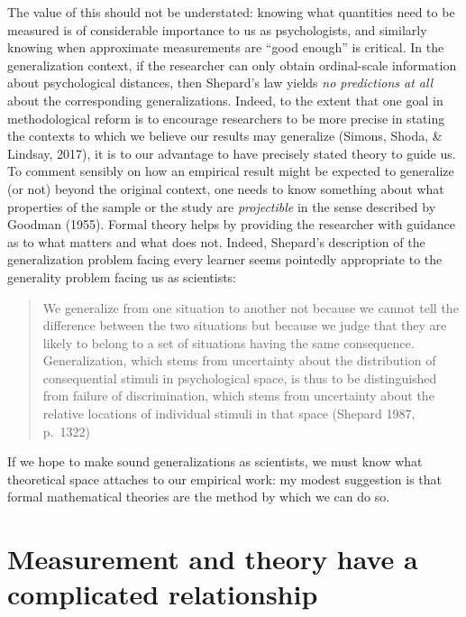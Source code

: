 \documentclass[
  english,
  doc]{apa6}
\begin{document}
The value of this should not be understated: knowing what quantities need to be measured is of considerable importance to us as psychologists, and similarly knowing when approximate measurements are \enquote{good enough} is critical. In the generalization context, if the researcher can only obtain ordinal-scale information about psychological distances, then Shepard's law yields \emph{no predictions at all} about the corresponding generalizations. Indeed, to the extent that one goal in methodological reform is to encourage researchers to be more precise in stating the contexts to which we believe our results may generalize (Simons, Shoda, \& Lindsay, 2017), it is to our advantage to have precisely stated theory to guide us. To comment sensibly on how an empirical result might be expected to generalize (or not) beyond the original context, one needs to know something about what properties of the sample or the study are \emph{projectible} in the sense described by Goodman (1955). Formal theory helps by providing the researcher with guidance as to what matters and what does not. Indeed, Shepard's description of the generalization problem facing every learner seems pointedly appropriate to the generality problem facing us as scientists:

\begin{quote}
We generalize from one situation to another not because we cannot tell the difference between the two situations but because we judge that they are likely to belong to a set of situations having the same consequence. Generalization, which stems from uncertainty about the distribution of consequential stimuli in psychological space, is thus to be distinguished from failure of discrimination, which stems from uncertainty about the relative locations of individual stimuli in that space (Shepard 1987, p.~1322)
\end{quote}

\noindent
If we hope to make sound generalizations as scientists, we must know what theoretical space attaches to our empirical work: my modest suggestion is that formal mathematical theories are the method by which we can do so.

\hypertarget{measurement-and-theory-have-a-complicated-relationship}{%
\section{Measurement and theory have a complicated relationship}\label{measurement-and-theory-have-a-complicated-relationship}}
\end{document}
